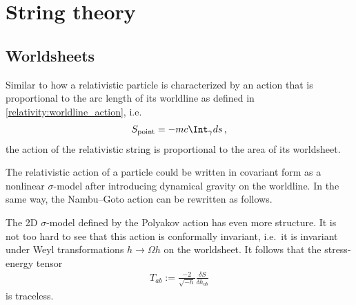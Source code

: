 \section{String theory}
\subsection{Worldsheets}

    Similar to how a relativistic particle is characterized by an action that is proportional to the arc length of its worldline as defined in \cref{relativity:worldline_action}, i.e.
    \begin{gather}
        S_{\text{point}}=-mc\Int_\gamma ds\,,
    \end{gather}
    the action of the relativistic string is proportional to the area of its worldsheet.

    The relativistic action of a particle could be written in covariant form as a nonlinear $\sigma$-model after introducing dynamical gravity on the worldline. In the same way, the Nambu--Goto action can be rewritten as follows.

    \begin{property}
        The 2D $\sigma$-model defined by the Polyakov action has even more structure. It is not too hard to see that this action is conformally invariant, i.e.~it is invariant under Weyl transformations $h\longrightarrow\Omega h$ on the worldsheet. It follows that the stress-energy tensor
        \begin{gather}
            T_{ab} := \frac{-2}{\sqrt{-h}}\frac{\delta S}{\delta h_{ab}}
        \end{gather}
        is traceless.
    \end{property}

